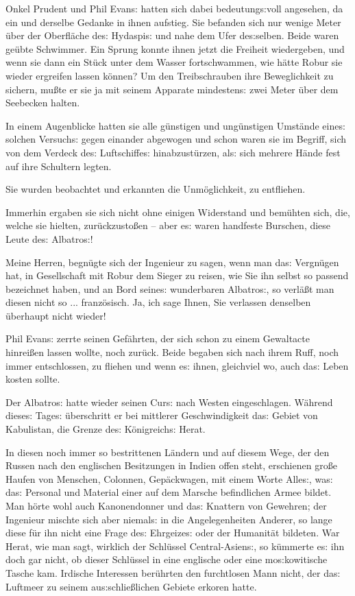\documentclass[oneside,12pt]{book}
\newcommand{\s}{s:}
\begin{document}
Onkel Prudent und Phil Evan{\s} hatten sich dabei bedeutung{\s}voll
angesehen, da ein und derselbe Gedanke in ihnen aufstieg. Sie
befanden sich nur wenige Meter \"uber der Oberfl\"ache de{\s}
Hydaspi{\s} und nahe dem Ufer de{\s}selben. Beide waren ge\"ubte
Schwimmer. Ein Sprung konnte ihnen jetzt die Freiheit wiedergeben,
und wenn sie dann ein St\"uck unter dem Wasser fortschwammen, wie
h\"atte Robur sie wieder ergreifen lassen k\"onnen? Um den
Treibschrauben ihre Beweglichkeit zu sichern, mu{\ss}te er sie ja mit
seinem Apparate mindesten{\s} zwei Meter \"uber dem Seebecken halten.

In einem Augenblicke hatten sie alle g\"unstigen und ung\"unstigen
Um\-st\"an\-de eine{\s} solchen Versuch{\s} gegen einander abgewogen
und schon waren sie im Begriff, sich von dem Verdeck de{\s}
Luftschiffe{\s} hinabzust\"urzen, al{\s} sich mehrere H\"ande fest
auf ihre Schultern legten.

Sie wurden beobachtet und erkannten die Unm\"oglichkeit, zu
entfliehen.

Immerhin ergaben sie sich nicht ohne einigen Widerstand und
bem\"uhten sich, die, welche sie hielten, zur\"uckzusto{\ss}en --
aber e{\s} waren handfeste Burschen, diese Leute de{\s}
{\glqq}Albatro{\s}{\grqq}!

{\glqq}Meine Herren, begn\"ugte sich der Ingenieur zu sagen, wenn man
da{\s} Vergn\"ugen hat, in Gesellschaft mit Robur dem Sieger zu
reisen, wie Sie ihn selbst so passend bezeichnet haben, und an Bord
seine{\s} wunderbaren {\glqq}Albatro{\s}{\grqq}, so verl\"a{\ss}t man
diesen nicht so ... franz\"osisch. Ja, ich sage Ihnen, Sie verlassen
denselben \"uberhaupt nicht wieder!{\grqq}

Phil Evan{\s} zerrte seinen Gef\"ahrten, der sich schon zu einem
Gewaltacte hinrei{\ss}en lassen wollte, noch zur\"uck. Beide begaben
sich nach ihrem Ruff, noch immer entschlossen, zu fliehen und wenn
e{\s} ihnen, gleichviel wo, auch da{\s} Leben kosten sollte.

Der {\glqq}Albatro{\s}{\grqq} hatte wieder seinen Cur{\s} nach Westen
eingeschlagen. W\"ahrend diese{\s} Tage{\s} \"uberschritt er bei
mittlerer Geschwindigkeit da{\s} Gebiet von Kabulistan, die Grenze
de{\s} K\"onigreich{\s} Herat.

In diesen noch immer so bestrittenen L\"andern und auf diesem Wege,
der den Russen nach den englischen Besitzungen in Indien offen steht,
erschienen gro{\ss}e Haufen von Menschen, Colonnen, Gep\"ackwagen,
mit einem Worte Alle{\s}, wa{\s} da{\s} Personal und Material einer
auf dem Marsche befindlichen Armee bildet. Man h\"orte wohl auch
Kanonendonner und da{\s} Knattern von Gewehren; der Ingenieur mischte
sich aber niemal{\s} in die Angelegenheiten Anderer, so lange diese
f\"ur ihn nicht eine Frage de{\s} Ehrgeize{\s} oder der Humanit\"at
bildeten. War Herat, wie man sagt, wirklich der Schl\"ussel
Central-Asien{\s}, so k\"ummerte e{\s} ihn doch gar nicht, ob dieser
Schl\"ussel in eine englische oder eine mo{\s}kowitische Tasche kam.
Irdische Interessen ber\"uhrten den furchtlosen Mann nicht, der
da{\s} Luftmeer zu seinem au{\s}schlie{\ss}lichen Gebiete erkoren
hatte.
\end{document}

